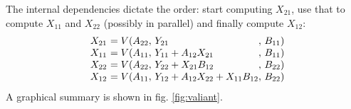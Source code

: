 \documentclass{CSML}
\numberwithin{theorem}{section}
\begin{document}
The internal dependencies dictate the order: start computing $X_{21}$,
use that to compute $X_{11}$ and $X_{22}$ (possibly in parallel) and
finally compute $X_{12}$:
$$
\begin{array}{r@{~= V (}l@{,~}l@{,~}l@{)}}
 X_{21} & A_{22}     & Y_{21}                                & B_{11}\\
 X_{11} & A_{11}     & Y_{11}   + A_{12} X_{21}                & B_{11}\\
 X_{22} & A_{22}     & Y_{22}   + X_{21} B_{12}                & B_{22} \\
 X_{12} & A_{11}     & Y_{12}   + A_{12} X_{22} + X_{11} B_{12}  & B_{22}\\
\end{array}
$$
A graphical summary is shown in fig. \ref{fig:valiant}.
\end{document}
